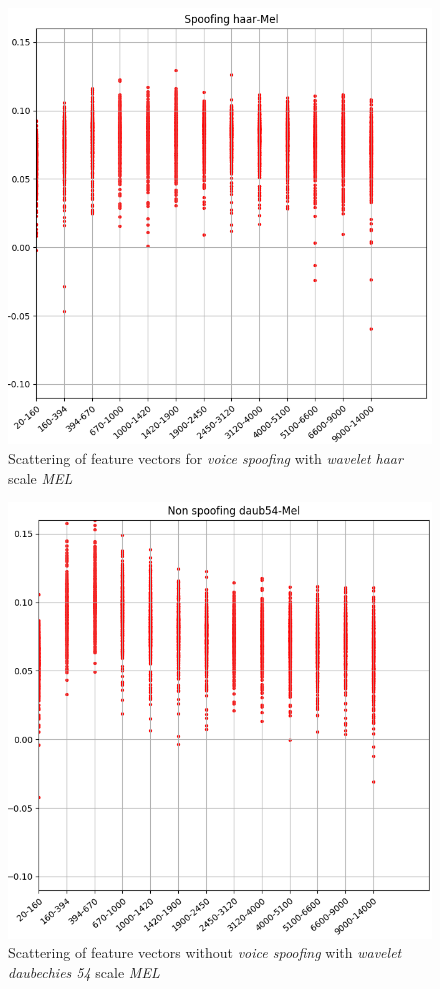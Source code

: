		\begin{figure}[H]
			\centering
			\includegraphics[scale=.55]{images/results/barkVersusMel/spoofingHaarMel}
			\caption{Scattering of feature vectors for \textit{voice spoofing} with \textit{wavelet haar} scale \textit{MEL}}
			\label{fig:spoofinghaarmel}
		\end{figure}
		
		\begin{figure}[H]
			\centering
			\includegraphics[scale=.55]{images/results/barkVersusMel/liveDaub54Mel}
			\caption{Scattering of feature vectors without \textit{voice spoofing} with \textit{wavelet daubechies 54} scale \textit{MEL}}
			\label{fig:livedaub54mel}
		\end{figure}
		
